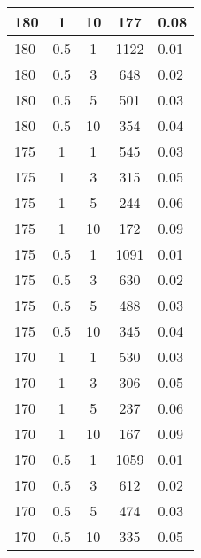 \begin{longtable} {| p{3cm} | c | c | c | p{2cm} |}
	180 & 1 & 10 &  177    & 0.08          \\ \hline
	180 & 0.5 & 1  &  1122 & 0.01             \\ \hline
	180 & 0.5 & 3  &  648  & 0.02            \\ \hline
	180 & 0.5 & 5  &  501  & 0.03            \\ \hline
	180 & 0.5 & 10 &  354  & 0.04            \\ \hline
	175 & 1 & 1  &  545    & 0.03          \\ \hline
	175 & 1 & 3  &  315    & 0.05          \\ \hline
	175 & 1 & 5  &  244    & 0.06          \\ \hline
	175 & 1 & 10 &  172    & 0.09          \\ \hline
	175 & 0.5 & 1  &  1091 & 0.01             \\ \hline
	175 & 0.5 & 3  &  630  & 0.02            \\ \hline
	175 & 0.5 & 5  &  488  & 0.03            \\ \hline
	175 & 0.5 & 10 &  345  & 0.04            \\ \hline
	170 & 1 & 1  &  530    & 0.03          \\ \hline
	170 & 1 & 3  &  306    & 0.05          \\ \hline
	170 & 1 & 5  &  237    & 0.06          \\ \hline
	170 & 1 & 10 &  167    & 0.09          \\ \hline
	170 & 0.5 & 1  &  1059 & 0.01             \\ \hline
	170 & 0.5 & 3  &  612  & 0.02            \\ \hline
	170 & 0.5 & 5  &  474  & 0.03            \\ \hline
	170 & 0.5 & 10 &  335  & 0.05            \\ \hline
\end{longtable}







\clearpage
{}